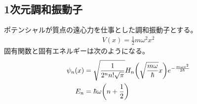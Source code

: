 \documentclass[uplatex,dvipdfmx,a4paper,11pt]{jlreq}
\theoremstyle{definition}
\begin{document}
\subsection{1次元調和振動子}
\begin{proposition}
  ポテンシャルが質点の遠心力を仕事とした調和振動子とする。
  \begin{align}
    V(x) = \frac{1}{2}m\omega^2x^2
  \end{align}
  固有関数と固有エネルギーは次のようになる。
  \begin{align}
    \psi_n(x) & = \sqrt{\frac{1}{2^nn!\sqrt{\pi}}}H_n\qty(\sqrt{\frac{m\omega}{\hbar}}x)e^{-\frac{m\omega x^2}{2\hbar}} \\
    E_n       & = \hbar\omega\qty(n + \frac{1}{2})
  \end{align}
\end{proposition}
\end{document}
